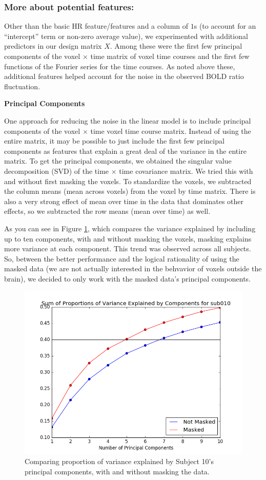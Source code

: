 \subsubsection{More about potential features:}
\par Other than the basic HR feature/features and a column of $1$s (to account 
for an ``intercept'' term or non-zero average value), we experimented with 
additional predictors in our design matrix $X$. Among these were the 
first few principal components of the voxel $\times$ time matrix of voxel time 
courses and the first few functions of the Fourier series for the time courses. 
As noted above these, additional features helped account for the noise in the 
observed BOLD ratio fluctuation.

\vspace{2mm}
\noindent \textbf{Principal Components}
\vspace{2mm}
\par One approach for reducing the noise in the linear model is to include 
principal components of the voxel $\times$ time voxel time course matrix. 
Instead of using the entire matrix, it may be possible to just include the 
first few principal components as features that explain a great deal of the 
variance in the entire matrix. To get the principal components, we obtained 
the singular value decomposition (SVD) of the time $\times$ time covariance 
matrix. We tried this with and without first masking the voxels. To 
standardize the voxels, we subtracted the column means (mean across voxels) 
from the voxel by time matrix. There is also a very strong effect of mean 
over time in the data that dominates other effects, so we subtracted the 
row means (mean over time) as well.

As you can see in Figure \ref{fig:pca10}, which compares the variance 
explained by including up to ten components, with and without masking the 
voxels, masking explains more variance at each component. This trend was 
observed across all subjects. So, between the better performance and the 
logical rationality of using the masked data (we are not actually interested 
in the behvavior of voxels outside the brain), we decided to only work with 
the masked data's principal components. 

\begin{figure}[ht]
	\centering
	\includegraphics[width=.5\linewidth]{../images/pcacumsumssub010.png}
 	\caption{Comparing proportion of variance explained by Subject 10's 
principal components, with and without masking the data.}
 	\label{fig:pca10}
\end{figure}

